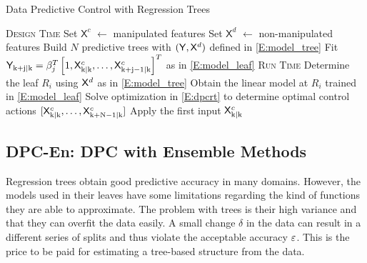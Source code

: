 \begin{algorithm}[t!]
	\caption{Data Predictive Control with Regression Trees}
	\label{A:dpcrt}
	\begin{algorithmic}[1]
		\State \textsc{Design Time}
		\State Set $\mathsf{X}^c$ $\gets$ manipulated features
		\State Set $\mathsf{X}^d$ $\gets$ non-manipulated features
		\State Build $N$ predictive trees with $(\mathsf{Y},\mathsf{X}^d)$ defined in \eqref{E:model_tree}
		\State Fit $ \mathsf{Y}_{\mathrm{k+j|k}} =  \beta^T_j \left[1,\mathsf{X}^c_{\mathrm{k|k}},\dots,\mathsf{X}^c_{\mathrm{k+j-1|k}} \right]^T$ as in \eqref{E:model_leaf}
		\EndFor
		\EndFor
		\EndProcedure
		\State \textsc{Run Time}
		\State Determine the leaf $R_i$ using $\mathsf{X}^d$ as in \eqref{E:model_tree}
		\State Obtain the linear model at $R_{i}$ trained in \eqref{E:model_leaf}
		\EndFor
		\State Solve optimization in \eqref{E:dpcrt} to determine optimal
		\State control actions $[\mathsf{X}^c_{\mathrm{k|k}},\dots,\mathsf{X}^c_{\mathrm{k+N-1|k}}]$
		\State Apply the first input $\mathsf{X}^c_{\mathrm{k|k}}$
		\EndWhile
		\EndProcedure
	\end{algorithmic}
\end{algorithm}

\subsection{DPC-En: DPC with Ensemble Methods}
\label{SS:dpcrf}
Regression trees obtain good predictive accuracy in many domains. However, the models used in their leaves have some limitations regarding the kind of functions they are able to approximate.
The problem with trees is their high variance and that they can overfit the data easily.
A small change $\delta$ in the data can result in a different series of splits and thus violate the acceptable accuracy $\varepsilon$.
This is the price to be paid for estimating a tree-based structure from the data.

